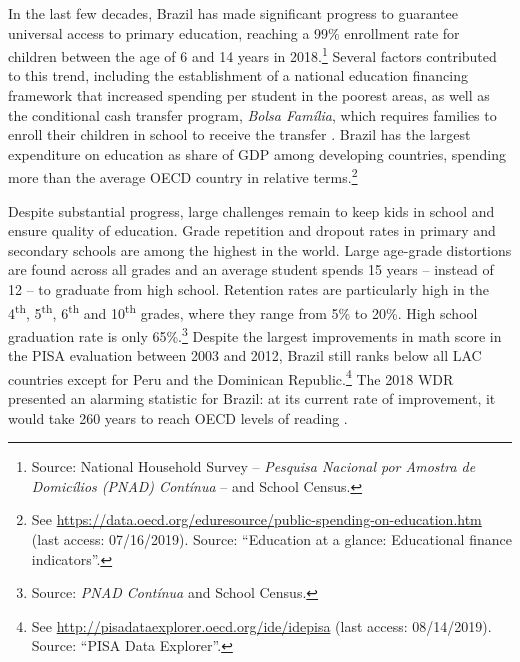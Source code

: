 \documentclass[11pt,a4paper]{article}
\begin{document}
In the last few decades, Brazil has made significant progress to guarantee universal access to primary education, reaching a 99\% enrollment rate for children between the age of 6 and 14 years in 2018.\footnote{Source: National Household Survey -- \textit{Pesquisa Nacional por Amostra de Domicílios (PNAD) Contínua} -- and School Census.} Several factors contributed to this trend, including the establishment of a national education financing framework that increased spending per student in the poorest areas, as well as the conditional cash transfer program, \textit{Bolsa Família}, which requires families to enroll their children in school to receive the transfer \citep{glewwe2012impact}. Brazil has the largest expenditure on education as share of GDP among developing countries, spending more than the average OECD country in relative terms.\footnote{See \url{https://data.oecd.org/eduresource/public-spending-on-education.htm} (last access: 07/16/2019). Source: ``Education at a glance: Educational finance indicators''.} 

Despite substantial progress, large challenges remain to keep kids in school and ensure quality of education. Grade repetition and dropout rates in primary and secondary schools are among the highest in the world. Large age-grade distortions are found across all grades and an average student spends 15 years -- instead of 12 -- to graduate from high school. Retention rates are particularly high in the 4\textsuperscript{th}, 5\textsuperscript{th}, 6\textsuperscript{th} and 10\textsuperscript{th} grades, where they range from 5\% to 20\%. High school graduation rate is only 65\%.\footnote{Source: \textit{PNAD Contínua} and School Census.} Despite the largest improvements in math score in the PISA evaluation between 2003 and 2012, Brazil still ranks below all LAC countries except for Peru and the Dominican Republic.\footnote{See \url{http://pisadataexplorer.oecd.org/ide/idepisa} (last access: 08/14/2019). Source: ``PISA Data Explorer''.} The 2018 WDR presented an alarming statistic for Brazil: at its current rate of improvement, it would take 260 years to reach OECD levels of reading \citep{WDR2018}. 
\end{document}
